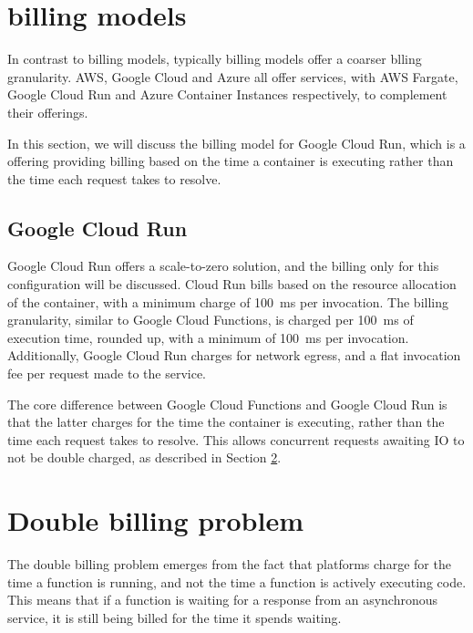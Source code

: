 \section{\caas{} billing models}
In contrast to \faas{} billing models, typically \caasxlong{} billing models offer a coarser blling granularity. AWS, Google Cloud and Azure all offer \caas{} services, with AWS Fargate, Google Cloud Run and Azure Container Instances respectively, to complement their \faas{} offerings.

In this section, we will discuss the billing model for Google Cloud Run, which is a \caas{} offering providing billing based on the time a container is executing rather than the time each request takes to resolve.

\subsection{Google Cloud Run}
\label{sec:cloud-run-billing-model}
Google Cloud Run offers a scale-to-zero solution, and the billing only for this configuration will be discussed. Cloud Run bills based on the resource allocation of the container, with a minimum charge of \SI{100}{\milli\second} per invocation\cite{PricingCloudRun}. The billing granularity, similar to Google Cloud Functions, is charged per \SI{100}{\milli\second} of execution time, rounded up, with a minimum of \SI{100}{\milli\second} per invocation. Additionally, Google Cloud Run charges for network egress, and a flat invocation fee per request made to the service.

The core difference between Google Cloud Functions and Google Cloud Run is that the latter charges for the time the container is executing, rather than the time each request takes to resolve. This allows concurrent requests awaiting IO to not be double charged, as described in Section \ref{sec:double-billing-problem}.

\section{Double billing problem}
\label{sec:double-billing-problem}

The double billing problem emerges from the fact that \faas{} platforms charge for the time a function is running, and not the time a function is actively executing code. This means that if a function is waiting for a response from an asynchronous service, it is still being billed for the time it spends waiting.

